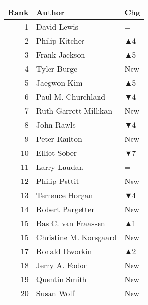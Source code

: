 \documentclass[
  10pt,
  letterpaper,
  DIV=11,
  numbers=noendperiod,
  twoside]{scrartcl}
\begin{document}
\begin{table}
\begin{minipage}{0.20\linewidth}
{\begin{tabular}{rll}
\toprule
Rank & Author & Chg\\
\midrule
1 & David Lewis & =\\
2 & Philip Kitcher & \textcolor[RGB]{34,178,34}{▲4}\\
3 & Frank Jackson & \textcolor[RGB]{34,178,34}{▲5}\\
4 & Tyler Burge & \textcolor[RGB]{34,178,34}{New}\\
5 & Jaegwon Kim & \textcolor[RGB]{34,178,34}{▲5}\\
6 & Paul M. Churchland & \textcolor[RGB]{178,34,34}{▼4}\\
7 & Ruth Garrett Millikan & \textcolor[RGB]{34,178,34}{New}\\
8 & John Rawls & \textcolor[RGB]{178,34,34}{▼4}\\
9 & Peter Railton & \textcolor[RGB]{34,178,34}{New}\\
10 & Elliot Sober & \textcolor[RGB]{178,34,34}{▼7}\\
11 & Larry Laudan & =\\
12 & Philip Pettit & \textcolor[RGB]{34,178,34}{New}\\
13 & Terrence Horgan & \textcolor[RGB]{178,34,34}{▼4}\\
14 & Robert Pargetter & \textcolor[RGB]{34,178,34}{New}\\
15 & Bas C. van Fraassen & \textcolor[RGB]{34,178,34}{▲1}\\
15 & Christine M. Korsgaard & \textcolor[RGB]{34,178,34}{New}\\
17 & Ronald Dworkin & \textcolor[RGB]{34,178,34}{▲2}\\
18 & Jerry A. Fodor & \textcolor[RGB]{34,178,34}{New}\\
19 & Quentin Smith & \textcolor[RGB]{34,178,34}{New}\\
20 & Susan Wolf & \textcolor[RGB]{34,178,34}{New}\\
\bottomrule
\end{tabular}

}

\end{minipage}%
%
\begin{minipage}{0.20\linewidth}


\centering{

}
\end{minipage}
\end{table}
\end{document}
